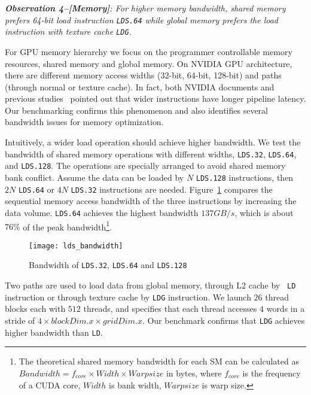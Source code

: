 {\em {\bf Observation 4--[Memory]}: For higher memory bandwidth, shared memory prefers 64-bit load 
instruction {\tt LDS.64} while global memory prefers the load instruction with texture cache {\tt LDG}.}

For GPU memory hierarchy we focus on the programmer controllable memory resources, shared memory and global memory. 
On NVIDIA GPU architecture, there are different memory access widths (32-bit, 64-bit, 128-bit) and paths (through normal or texture cache). 
In fact, both NVIDIA documents and previous studies~\cite{tan} pointed out that wider 
instructions have longer pipeline latency.
Our benchmarking confirms this phenomenon and also identifies several bandwidth issues for memory optimization.


Intuitively, a wider load operation should achieve higher bandwidth. 
We test the bandwidth of shared memory operations with different widths, {\tt LDS.32}, {\tt LDS.64},
and {\tt LDS.128}. 
The operations are specially arranged to avoid shared memory bank conflict. 
Assume the data can be loaded by $N$ {\tt LDS.128} instructions, 
then $2N$ {\tt LDS.64} or $4N$ {\tt LDS.32} instructions are needed.
Figure~\ref{fig:lds_bw} compares the sequential memory access bandwidth of the three instructions by increasing the data volume. 
{\tt LDS.64} achieves the highest bandwidth $137GB/s$, which is about $76\%$ of the peak bandwidth\footnote{The 
theoretical shared memory bandwidth for each SM can be calculated as $Bandwidth = f_{core} \times Width \times Warpsize$ in
bytes, where $f_{core}$ is the frequency of a CUDA core, $Width$ is bank width, $Warpsize$ is warp size.}.

\begin{figure}[htbp]
\begin{center}
\texttt{[image: lds\_bandwidth]}
    \caption{ Bandwidth of {\tt LDS.32}, {\tt LDS.64} and {\tt LDS.128}}
\label{fig:lds_bw}
\end{center}
\end{figure}

Two paths are used to load data from global memory, through L2 cache by {\tt
LD} instruction or through texture cache by {\tt LDG} instruction. 
We launch $26$ thread blocks each with $512$ threads, and specifies that each thread accesses $4$ words in a stride of $4 \times blockDim.x \times gridDim.x$. 
Our benchmark confirms that {\tt LDG} achieves higher bandwidth than {\tt LD}.
